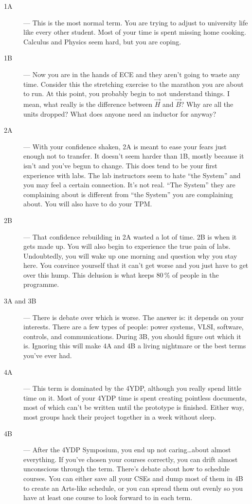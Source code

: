 \documentclass{book}
\begin{document}
\begin{description}
\item[1A] --- This is the most normal term. You are trying to adjust to university life like every other student. Most of your time is spent missing home cooking. Calculus and Physics seem hard, but you are coping.
\item[1B] --- Now you are in the hands of ECE and they aren't going to waste any time. Consider this the stretching exercise to the marathon you are about to run. At this point, you probably begin to not understand things. I mean, what really is the difference between $\vec{H}$ and $\vec{B}$? Why are all the units dropped? What does anyone need an inductor for anyway?
\item[2A] --- With your confidence shaken, 2A is meant to ease your fears just enough not to transfer. It doesn't seem harder than 1B, mostly because it isn't and you've begun to change. This does tend to be your first experience with labs. The lab instructors seem to hate ``the System'' and you may feel a certain connection. It's not real. ``The System'' they are complaining about is different from ``the System'' you are complaining about. You will also have to do your TPM.
\item[2B] --- That confidence rebuilding in 2A wasted a lot of time. 2B is when it gets made up. You will also begin to experience the true pain of labs. Undoubtedly, you will wake up one morning and question why you stay here. You convince yourself that it can't get worse and you just have to get over this hump. This delusion is what keeps 80\,\% of people in the programme.
\item[3A and 3B] --- There is debate over which is worse. The answer is: it depends on your interests. There are a few types of people: power systems, VLSI, software, controls, and communications. During 3B, you should figure out which it is. Ignoring this will make 4A and 4B a living nightmare or the best terms you've ever had.
\item[4A] --- This term is dominated by the 4YDP, although you really spend little time on it. Most of your 4YDP time is spent creating pointless documents, most of which can't be written until the prototype is finished. Either way, most groups hack their project together in a week without sleep.
\item[4B] --- After the 4YDP Symposium, you end up not caring\dots{}about almost everything. If you've chosen your courses correctly, you can drift almost unconscious through the term. There's debate about how to schedule courses. You can either save all your CSEs and dump most of them in 4B to create an Arts-like schedule, or you can spread them out evenly so you have at least one course to look forward to in each term.
\end{description}
\end{document}

